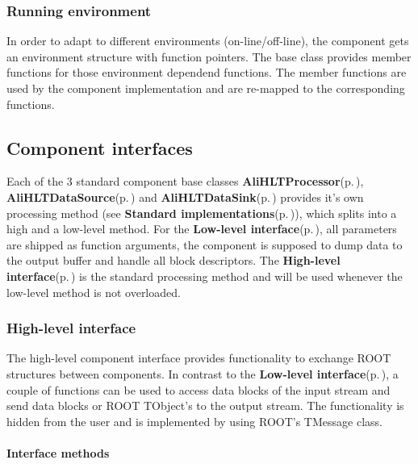 \subsubsection{Running environment}\label{classAliHLTComponent_alihltcomponent-environment}
In order to adapt to different environments (on-line/off-line), the component gets an environment structure with function pointers. The base class provides member functions for those environment dependend functions. The member functions are used by the component implementation and are re-mapped to the corresponding functions. \subsection{Component interfaces}\label{classAliHLTComponent_alihltcomponent-interfaces}
Each of the 3 standard component base classes {\bf Ali\-HLTProcessor}{\rm (p.\,\pageref{classAliHLTProcessor})}, {\bf Ali\-HLTData\-Source}{\rm (p.\,\pageref{classAliHLTDataSource})} and {\bf Ali\-HLTData\-Sink}{\rm (p.\,\pageref{classAliHLTDataSink})} provides it's own processing method (see {\bf Standard implementations}{\rm (p.\,\pageref{classAliHLTComponent_alihltcomponent-type-std})}), which splits into a high and a low-level method. For the {\bf Low-level interface}{\rm (p.\,\pageref{classAliHLTComponent_alihltcomponent-low-level-interface})}, all parameters are shipped as function arguments, the component is supposed to dump data to the output buffer and handle all block descriptors. The {\bf High-level interface}{\rm (p.\,\pageref{classAliHLTComponent_alihltcomponent-high-level-interface})} is the standard processing method and will be used whenever the low-level method is not overloaded.\subsubsection{High-level interface}\label{classAliHLTComponent_alihltcomponent-high-level-interface}
The high-level component interface provides functionality to exchange ROOT structures between components. In contrast to the {\bf Low-level interface}{\rm (p.\,\pageref{classAliHLTComponent_alihltcomponent-low-level-interface})}, a couple of functions can be used to access data blocks of the input stream and send data blocks or ROOT TObject's to the output stream. The functionality is hidden from the user and is implemented by using ROOT's TMessage class.\paragraph{Interface methods}\label{classAliHLTComponent_alihltcomponent-high-level-int-methods}
